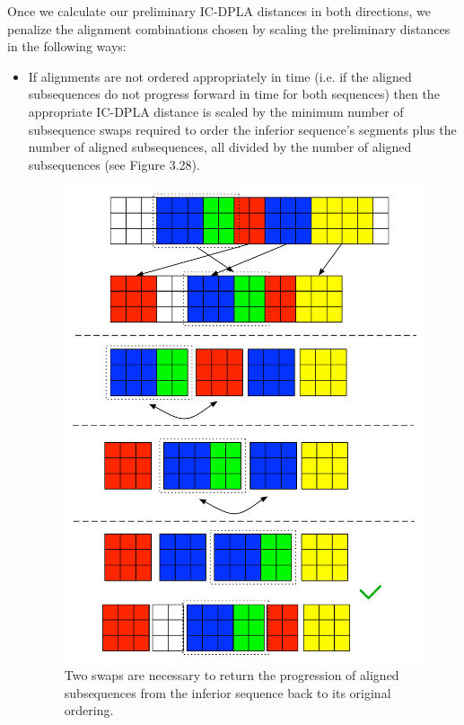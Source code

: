 \documentclass[a4paper,12pt]{report} 	%
\numberwithin{figure}{chapter}
\numberwithin{table}{chapter}
\numberwithin{equation}{chapter}
\begin{document}
\begin{flushleft}
Once we calculate our preliminary IC-DPLA distances in both directions, we penalize the alignment combinations chosen by scaling the preliminary distances in the following ways:
\begin{itemize}
\item If alignments are not ordered appropriately in time (i.e. if the aligned subsequences do not progress forward in time for both sequences) then the appropriate IC-DPLA distance is scaled by the minimum number of subsequence swaps required to order the inferior sequence's segments plus the number of aligned subsequences, all divided by the number of aligned subsequences (see Figure 3.28). 
\begin{figure}[h!]
\begin{center}
\includegraphics[scale=0.7]{Penalty_1}
\caption[Penalizing Swaps]{Two swaps are necessary to return the progression of aligned subsequences from the inferior sequence back to its original ordering.}
\end{center}

\end{figure}
\end{itemize}
\end{flushleft}
\end{document}

